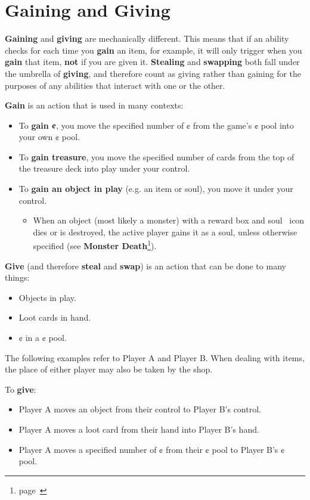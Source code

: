 \documentclass[
  fontsize=10pt,
  paper=a5,
  version=last,
  chapterprefix=true,
  bindingoffset=5mm,
  ]{scrbook}
\newcommand*{\inlineicon}[1]{%
    \raisebox{-.3\baselineskip}{%
        \smash{%
            \texttt{[image: \#1]}%
        }%
    }%
}
\newcommand{\soul}{\inlineicon{./assets/ms-soul.png}}
\begin{document}
    \section{Gaining and Giving}
    \label{gaining}
    \textbf{Gaining} and \textbf{giving} are mechanically different. This means that if an ability checks for each time you \textbf{gain} an item, for example, it will only trigger when you \textbf{gain} that item, \textbf{not} if you are given it. \textbf{Stealing} and \textbf{swapping} both fall under the umbrella of \textbf{giving}, and therefore count as giving rather than gaining for the purposes of any abilities that interact with one or the other.

    \textbf{Gain} is an action that is used in many contexts:
    \begin{itemize}
        \item To \textbf{gain ¢}, you move the specified number of ¢ from the game’s ¢ pool into your own ¢ pool.
        \item To \textbf{gain treasure}, you move the specified number of cards from the top of the treasure deck into play under your control.
        \item To \textbf{gain an object in play} (e.g. an item or soul), you move it under your control.
        \begin{itemize}
            \item When an object (most likely a monster) with a reward box and soul\soul\ icon dies or is destroyed, the active player gains it as a soul, unless otherwise specified (see \textbf{Monster Death}\footnote{page~\pageref{monsterdeath}}).  
        \end{itemize}
    \end{itemize}
    \textbf{Give} (and therefore \textbf{steal} and \textbf{swap}) is an action that can be done to many things:      
    \begin{itemize}
        \item Objects in play.
        \item Loot cards in hand.
        \item ¢ in a ¢ pool.
    \end{itemize}
    The following examples refer to Player A and Player B. When dealing with items, the place of either player may also be taken by the shop.
    
    To \textbf{give}:
    \begin{itemize}
        \item Player A moves an object from their control to Player B’s control.
        \item Player A moves a loot card from their hand into Player B’s hand.
        \item Player A moves a specified number of ¢ from their ¢ pool to Player B’s ¢ pool.
    \end{itemize}
\end{document}
